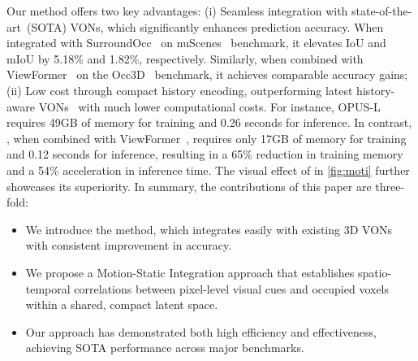Our method offers two key advantages: (i) Seamless integration with state-of-the-art~(SOTA) VONs, which significantly enhances prediction accuracy. When integrated with SurroundOcc~\cite{surroundOcc} on nuScenes~\cite{nuScenes} benchmark, it elevates IoU and mIoU by 5.18\% and 1.82\%, respectively. Similarly, when combined with ViewFormer~\cite{viewformer} on the Occ3D~\cite{Occ3D} benchmark, it achieves comparable accuracy gains; (ii) Low cost through compact history encoding, outperforming latest history-aware VONs~\cite{opus,bevdet4d,fb_occ} with much lower computational costs. For instance, OPUS-L~\cite{opus} requires 49GB of memory for training and 0.26 seconds for inference. In contrast, \ours, when combined with ViewFormer~\cite{viewformer}, requires only 17GB of memory for training and 0.12 seconds for inference, resulting in a 65\% reduction in training memory and a 54\% acceleration in inference time. The visual effect of \ours in \cref{fig:moti} further showcases its superiority. In summary, the contributions of this paper are three-fold:
\begin{itemize}
    \item We introduce the \ours method, which integrates easily with existing 3D VONs with consistent improvement in accuracy.
    \item We propose a Motion-Static Integration approach that establishes spatio-temporal correlations between pixel-level visual cues and occupied voxels within a shared, compact latent space.
    \item Our approach has demonstrated both high efficiency and effectiveness, achieving SOTA performance across major benchmarks.
\end{itemize}

